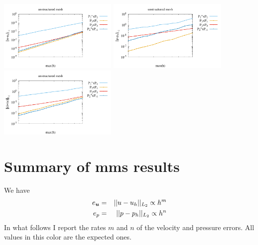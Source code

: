 \begin{center}
\includegraphics[width=5.7cm]{python_codes/fieldstone_120/paperresults/tesk12_unstructured_errorsV3.pdf}
\includegraphics[width=5.7cm]{python_codes/fieldstone_120/paperresults/tesk12_unstructured_errorsP3.pdf}
\includegraphics[width=5.7cm]{python_codes/fieldstone_120/paperresults/tesk12_unstructured_errors_divv3.pdf}
\end{center}













\newpage
\section*{Summary of mms results}


We have 
\begin{eqnarray}
e_{\bm u} &=&||u-u_h||_{L_2} \propto h^m \nonumber\\
e_p       &=&||p-p_h||_{L_2} \propto h^n \nonumber
\end{eqnarray}
In what follows I report the rates $m$ and $n$ of the velocity and pressure errors.
All values in {\color{teal} this color} are the expected ones.


